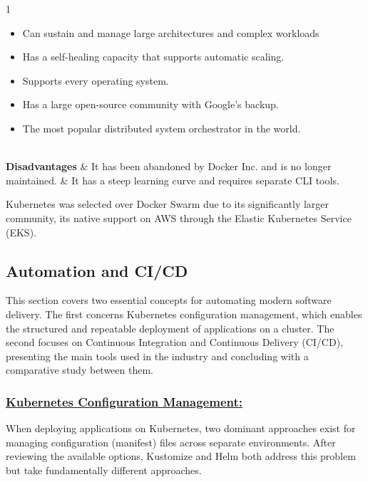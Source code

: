\begin{table}[H]
\begin{tabularx}{1\textwidth}
\begin{itemize}[leftmargin=*, topsep=0pt, itemsep=1pt, parsep=2pt]
            \item Can sustain and manage large architectures and complex workloads
            \item Has a self-healing capacity that supports automatic scaling.
            \item Supports every operating system.
            \item Has a large open-source community with Google's backup.
            \item The most popular distributed system orchestrator in the world.
        \end{itemize}                                                \\
        \hline
        \textbf {Disadvantages}             & \noindent It has been abandoned by Docker Inc. and is no longer maintained.                                                                                                                                                                                                        & \noindent It has a steep learning curve and requires separate CLI tools. \\
        \hline
    \end{tabularx}
\end{table}

Kubernetes was selected over Docker Swarm due to its significantly larger 
community, its native support on AWS through the Elastic Kubernetes Service (EKS).

\subsection{Automation and CI/CD}
This section covers two essential concepts for automating modern software delivery. 
The first concerns Kubernetes configuration management, which enables the 
structured and repeatable deployment of applications on a cluster. The second 
focuses on Continuous Integration and Continuous Delivery (CI/CD), presenting 
the main tools used in the industry and concluding with a comparative study 
between them.

\subsubsection*{\underline{Kubernetes Configuration Management:}}

When deploying applications on Kubernetes, two dominant approaches exist for 
managing configuration (manifest) files across separate environments. After reviewing the 
available options, Kustomize and Helm both address this problem but take 
fundamentally different approaches.

